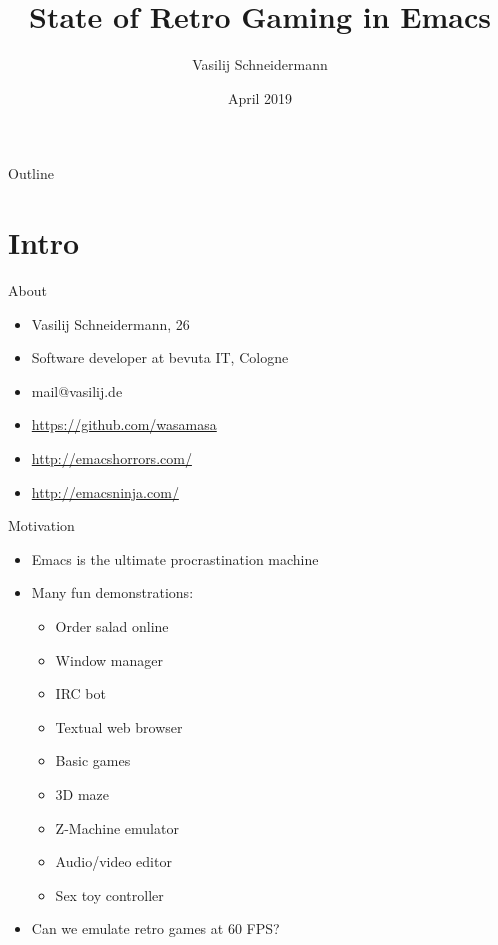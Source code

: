 \documentclass[presentation]{beamer}
\author{Vasilij Schneidermann}
\date{April 2019}
\title{State of Retro Gaming in Emacs}
\begin{document}
\maketitle
\begin{frame}{Outline}
\tableofcontents
\end{frame}

\AtBeginSection{\frame{\sectionpage}}

\section{Intro}
\label{sec:org95c154a}

\begin{frame}[label={sec:orgaeac524}]{About}
\begin{itemize}
\item Vasilij Schneidermann, 26
\item Software developer at bevuta IT, Cologne
\item mail@vasilij.de
\item \url{https://github.com/wasamasa}
\item \url{http://emacshorrors.com/}
\item \url{http://emacsninja.com/}
\end{itemize}
\end{frame}

\begin{frame}[label={sec:orgd02fa68}]{Motivation}
\begin{itemize}
\item Emacs is the ultimate procrastination machine
\item Many fun demonstrations:
\begin{itemize}
\item Order salad online
\item Window manager
\item IRC bot
\item Textual web browser
\item Basic games
\item 3D maze
\item Z-Machine emulator
\item Audio/video editor
\item Sex toy controller
\end{itemize}
\item Can we emulate retro games at 60 FPS?
\end{itemize}
\end{frame}
\end{document}
